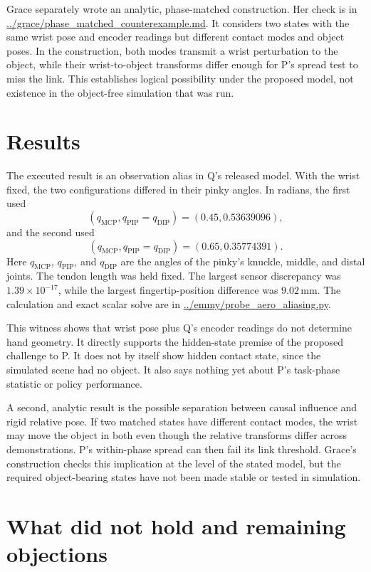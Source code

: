 \documentclass{article}
\begin{document}
Grace separately wrote an analytic, phase-matched construction.  Her check is in \url{../grace/phase_matched_counterexample.md}.  It considers two states with the same wrist pose and encoder readings but different contact modes and object poses.  In the construction, both modes transmit a wrist perturbation to the object, while their wrist-to-object transforms differ enough for P's spread test to miss the link.  This establishes logical possibility under the proposed model, not existence in the object-free simulation that was run.

\section{Results}

The executed result is an observation alias in Q's released model.  With the wrist fixed, the two configurations differed in their pinky angles.  In radians, the first used
\[
 (q_{\mathrm{MCP}},q_{\mathrm{PIP}}=q_{\mathrm{DIP}})
 =(0.45,0.53639096),
\]
and the second used
\[
 (q_{\mathrm{MCP}},q_{\mathrm{PIP}}=q_{\mathrm{DIP}})
 =(0.65,0.35774391).
\]
Here \(q_{\mathrm{MCP}}\), \(q_{\mathrm{PIP}}\), and \(q_{\mathrm{DIP}}\) are the angles of the pinky's knuckle, middle, and distal joints.  The tendon length was held fixed.  The largest sensor discrepancy was \(1.39\times10^{-17}\), while the largest fingertip-position difference was \(9.02\,\mathrm{mm}\).  The calculation and exact scalar solve are in \url{../emmy/probe_aero_aliasing.py}.

This witness shows that wrist pose plus Q's encoder readings do not determine hand geometry.  It directly supports the hidden-state premise of the proposed challenge to P.  It does not by itself show hidden contact state, since the simulated scene had no object.  It also says nothing yet about P's task-phase statistic or policy performance.

A second, analytic result is the possible separation between causal influence and rigid relative pose.  If two matched states have different contact modes, the wrist may move the object in both even though the relative transforms differ across demonstrations.  P's within-phase spread can then fail its link threshold.  Grace's construction checks this implication at the level of the stated model, but the required object-bearing states have not been made stable or tested in simulation.

\section{What did not hold and remaining objections}
\end{document}
